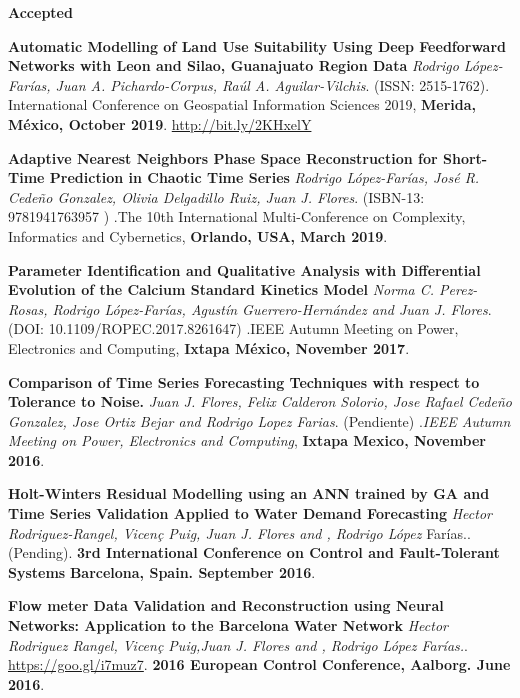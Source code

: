 \documentclass[10pt]{article}
\newenvironment{innerlist}[1][\enskip\textbullet]%
        {\begin{compactitem}[#1]}{\end{compactitem}}
\newcommand{\blankline}{\quad\pagebreak[2]}
\begin{document}
\blankline
\textbf{Accepted}
\begin{innerlist}

\item \textbf{Automatic Modelling of Land Use Suitability Using Deep Feedforward Networks with Leon and
Silao, Guanajuato Region Data} \textit{Rodrigo López-Farías, Juan A. Pichardo-Corpus, Raúl A. Aguilar-Vilchis}. (ISSN: 2515-1762). {International Conference on Geospatial Information Sciences 2019}, \textbf{Merida, México, October 2019}. \url{http://bit.ly/2KHxelY}

\item \textbf{Adaptive Nearest Neighbors Phase Space Reconstruction for Short-Time Prediction in Chaotic Time Series} \textit{Rodrigo López-Farías, José R. Cedeño Gonzalez, Olivia Delgadillo Ruiz, Juan J. Flores}. (ISBN-13: 9781941763957 ) .{The 10th International Multi-Conference on Complexity, Informatics and Cybernetics}, \textbf{Orlando, USA, March 2019}.


\item \textbf{Parameter Identification and Qualitative Analysis with Differential Evolution of the Calcium Standard Kinetics Model} \textit{Norma C. Perez-Rosas, Rodrigo López-Farías, Agustín Guerrero-Hernández and Juan J. Flores}. (DOI: 10.1109/ROPEC.2017.8261647) .{IEEE Autumn Meeting on Power, Electronics and Computing}, \textbf{Ixtapa México, November 2017}.


\item \textbf{Comparison of Time Series Forecasting Techniques with respect to Tolerance to Noise.} \textit{Juan J. Flores, Felix Calderon Solorio, Jose Rafael Cede\~no Gonzalez, Jose Ortiz Bejar and Rodrigo Lopez Farias}. (Pendiente) .\textit{IEEE Autumn Meeting on Power, Electronics and Computing}, \textbf{Ixtapa Mexico, November 2016}.


\item \textbf{Holt-Winters Residual Modelling using an ANN trained by GA and Time Series Validation Applied to Water Demand Forecasting} \textit{Hector Rodriguez-Rangel, Vicen\c{c} Puig, Juan J. Flores and ,  Rodrigo López} Farías.. (Pending). \textbf{3rd International Conference on Control and Fault-Tolerant Systems} \textbf{Barcelona, Spain. September 2016}.

\item \textbf{Flow meter Data Validation and Reconstruction using Neural Networks: Application to the Barcelona Water Network} \textit{Hector Rodriguez Rangel, Vicen\c{c} Puig,Juan J. Flores and ,  Rodrigo López Farías.}. \url{https://goo.gl/i7muz7}. \textbf{2016 European Control Conference, Aalborg. June 2016}.


\end{innerlist}
\end{document}
